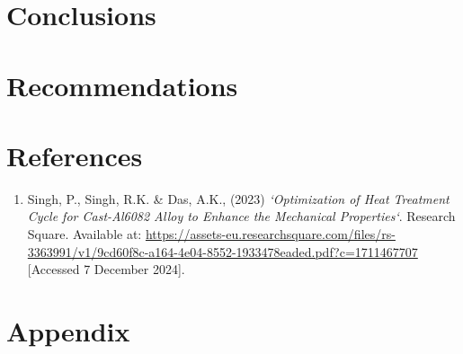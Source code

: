 \documentclass{article}
\begin{document}
    \section{Conclusions}

    \newpage\vspace*{-5pt}
    \section{Recommendations}

    \newpage\vspace*{-5pt}
    \section{References}
    \begin{enumerate}
        \item Singh, P., Singh, R.K. \& Das, A.K., (2023) \textit{‘Optimization of Heat Treatment Cycle for Cast-Al6082 Alloy to Enhance the Mechanical Properties‘}. Research Square. Available at: 	\url{https://assets-eu.researchsquare.com/files/rs-3363991/v1/9cd60f8c-a164-4e04-8552-1933478eaded.pdf?c=1711467707} [Accessed 7 December 2024]. 
    \end{enumerate}
    
    \newpage\vspace*{-5pt}
    
   
    
\section{Appendix}
\normalsize
\renewcommand{\thesubsection}{\Alph{subsection}}
\end{document}
